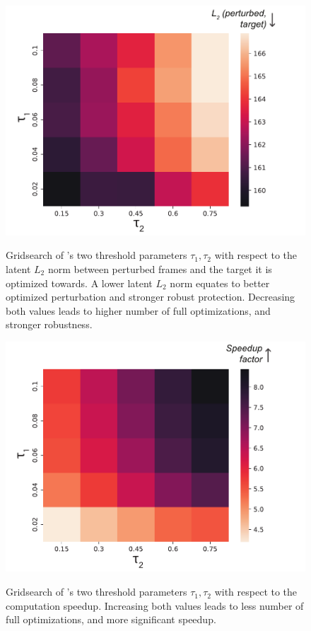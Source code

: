 \begin{figure}[t]
    \centering
    \begin{minipage}[t]{0.49\textwidth}
    \centering
    \includegraphics[width=0.9\columnwidth]{plots/heatmaps/flurdeh-adv-performance-eps-converted-to.pdf}
    \vspace{-0.1in}
    \caption{Gridsearch of \system's two threshold parameters $\tau_1, \tau_2$ with respect to the latent $L_2$ norm between perturbed frames and the target it is optimized towards. A lower latent $L_2$ norm equates to better optimized perturbation and stronger robust protection. Decreasing both values leads to higher number of full optimizations, and stronger robustness.}
    \label{fig:grid-search-robustness}
    \end{minipage}
    \hfill
    \centering
    \begin{minipage}[t]{0.49\textwidth}
    \centering
    \includegraphics[width=0.9\columnwidth]{plots/heatmaps/flurdeh-adv-speedup-eps-converted-to.pdf}
    \vspace{-0.1in}
    \caption{Gridsearch of \system's two threshold parameters $\tau_1, \tau_2$ with respect to the computation speedup. Increasing both values leads to less number of full optimizations, and more significant speedup.}
    \label{fig:grid-search-robustness}
    \label{fig:grid-search-efficiency}
    \end{minipage}
      \hfill
\end{figure}

